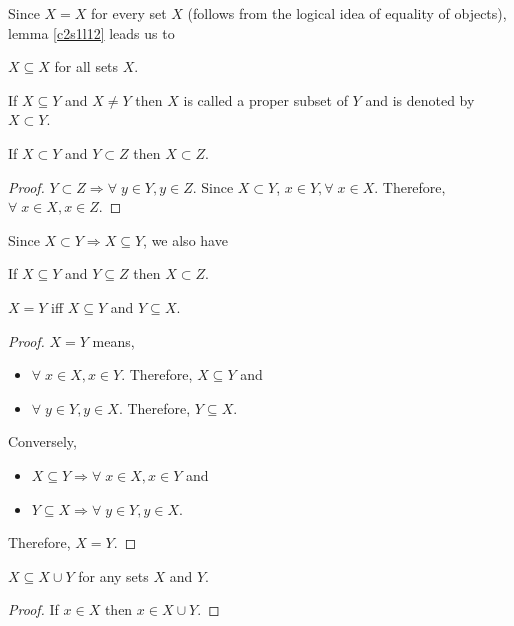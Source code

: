 Since $X = X$ for every set $X$ (follows from the logical idea of equality
of objects), lemma \ref{c2s1l12} leads us to
\begin{lem}\label{c2s2l13}
$X \subseteq X$ for all sets $X$.
\end{lem}

\begin{defn}\label{c2s1d2}
If $X \subseteq Y$ and $X \ne Y$ then $X$ is called a proper subset of 
$Y$ and is denoted by $X \subset Y$.
\end{defn}

\begin{lem}\label{c2s1l14}
If $X \subset Y$ and $Y \subset Z$ then $X \subset Z$.
\end{lem}
\begin{proof}
$Y \subset Z \Rightarrow \forall\; y \in Y, y \in Z$. Since $X \subset
Y$, $x \in Y, \forall\; x \in X$. Therefore, $\forall\; x \in X, x \in Z$.
\end{proof}

Since $X \subset Y \Rightarrow X \subseteq Y$, we also have
\begin{lem}\label{c2s1l15}
If $X \subseteq Y$ and $Y \subseteq Z$ then $X \subset Z$.
\end{lem}

\begin{lem}\label{c2s1l16}
$X = Y$ iff $X \subseteq Y$ and $Y \subseteq X$.
\end{lem}
\begin{proof}
$X = Y$ means,
\begin{itemize}
\item $\forall\; x \in X, x \in Y$. Therefore, $X \subseteq Y$ and
\item $\forall\; y \in Y, y \in X$. Therefore, $Y \subseteq X$.
\end{itemize}

Conversely,
\begin{itemize}
\item $X \subseteq Y \Rightarrow \forall\; x \in X, x \in Y$ and
\item $Y \subseteq X \Rightarrow \forall\; y \in Y, y \in X$.
\end{itemize}
Therefore, $X = Y$.
\end{proof}

\begin{lem}\label{c2s1l17}
$X \subseteq X \cup Y$ for any sets $X$ and $Y$.
\end{lem}
\begin{proof}
If $x \in X$ then $x \in X \cup Y$.
\end{proof}

